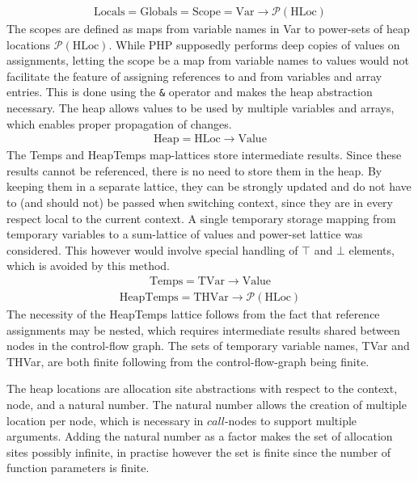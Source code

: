 \begin{align}
\text{Locals} = \text{Globals} = \text{Scope} = \text{Var} \rightarrow \mathcal{P}(\text{HLoc})
\end{align}
The scopes are defined as maps from variable names in Var to power-sets of heap locations $\mathcal{P}(\text{HLoc})$. While PHP supposedly performs deep copies of values on assignments, letting the scope be a map from variable names to values would not facilitate the feature of assigning references to and from variables and array entries. This is done using the \texttt{\&} operator and makes the heap abstraction necessary. The heap allows values to be used by multiple variables and arrays, which enables proper propagation of changes. 
\begin{align}
\text{Heap} = \text{HLoc} \rightarrow \text{Value}
\end{align}
The Temps and HeapTemps map-lattices store intermediate results. Since these results cannot be referenced, there is no need to store them in the heap. By keeping them in a separate lattice, they can be strongly updated and do not have to (and should not) be passed when switching context, since they are in every respect local to the current context. A single temporary storage mapping from temporary variables to a sum-lattice of values and power-set lattice was considered. This however would involve special handling of $\top$ and $\bot$ elements, which is avoided by this method. 
\begin{align}
\text{Temps} = \text{TVar} \rightarrow \text{Value}
\end{align}
\begin{align}
\text{HeapTemps} = \text{THVar} \rightarrow \mathcal{P}(\text{HLoc})
\end{align}
The necessity of the HeapTemps lattice follows from the fact that reference assignments may be nested, which requires intermediate results shared between nodes in the control-flow graph. The sets of temporary variable names, TVar and THVar, are both finite following from the control-flow-graph being finite.

The heap locations are allocation site abstractions with respect to the context, node, and a natural number. The natural number allows the creation of multiple location per node, which is necessary in $\mathit{call}$-nodes to support multiple arguments. Adding the natural number as a factor makes the set of allocation sites possibly infinite, in practise however the set is finite since the number of function parameters is finite.

